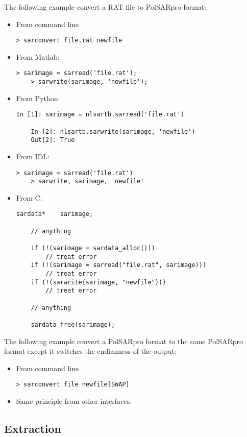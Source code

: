 \documentclass[10pt,french,english,a4paper]{article}
\begin{document}
The following example convert a RAT file to PolSARpro format:
\begin{itemize}
\item From command line
  \begin{Verbatim}[frame=single]
    > sarconvert file.rat newfile
  \end{Verbatim}
\item From Matlab:
  \begin{Verbatim}[frame=single]
    > sarimage = sarread('file.rat');
    > sarwrite(sarimage, 'newfile');
  \end{Verbatim}
\item From Python:
  \begin{Verbatim}[frame=single]
    In [1]: sarimage = nlsartb.sarread('file.rat')

    In [2]: nlsartb.sarwrite(sarimage, 'newfile')
    Out[2]: True
  \end{Verbatim}
\item From IDL:
  \begin{Verbatim}[frame=single]
    > sarimage = sarread('file.rat')
    > sarwrite, sarimage, 'newfile'
  \end{Verbatim}
\item From C:
  \begin{Verbatim}[frame=single]
    sardata*    sarimage;

    // anything

    if (!(sarimage = sardata_alloc()))
        // treat error
    if (!(sarimage = sarread("file.rat", sarimage)))
        // treat error
    if (!(sarwrite(sarimage, "newfile")))
        // treat error

    // anything

    sardata_free(sarimage);
  \end{Verbatim}
\end{itemize}

The following example convert a PolSARpro format to the same PolSARpro format
except it switches the endianness of the output:
\begin{itemize}
\item From command line
  \begin{Verbatim}[frame=single]
    > sarconvert file newfile[SWAP]
  \end{Verbatim}
\item Same principle from other interfaces.
\end{itemize}

\subsection{Extraction}
\end{document}
